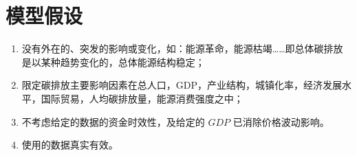 \section{模型假设}
  \begin{enumerate}
    \item 没有外在的、突发的影响或变化，如：能源革命，能源枯竭……即总体碳排放是以某种趋势变化的，总体能源结构稳定；
    \item 限定碳排放主要影响因素在总人口，GDP，产业结构，城镇化率，经济发展水平，国际贸易，人均碳排放量，能源消费强度之中；
    \item 不考虑给定的数据的资金时效性，及给定的 $GDP$ 已消除价格波动影响。
    \item 使用的数据真实有效。
  \end{enumerate}